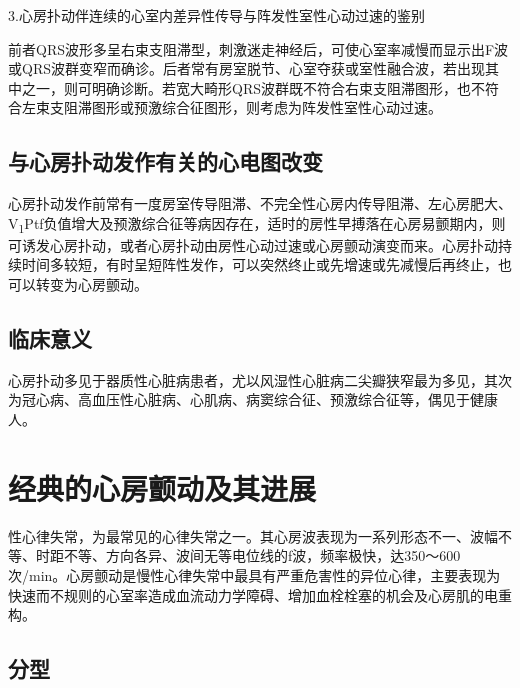 3.心房扑动伴连续的心室内差异性传导与阵发性室性心动过速的鉴别

前者QRS波形多呈右束支阻滞型，刺激迷走神经后，可使心室率减慢而显示出F波或QRS波群变窄而确诊。后者常有房室脱节、心室夺获或室性融合波，若出现其中之一，则可明确诊断。若宽大畸形QRS波群既不符合右束支阻滞图形，也不符合左束支阻滞图形或预激综合征图形，则考虑为阵发性室性心动过速。

\protect\hypertarget{text00020.htmlux5cux23subid198}{}{}

\subsection{与心房扑动发作有关的心电图改变}

心房扑动发作前常有一度房室传导阻滞、不完全性心房内传导阻滞、左心房肥大、V\textsubscript{1}Ptf负值增大及预激综合征等病因存在，适时的房性早搏落在心房易颤期内，则可诱发心房扑动，或者心房扑动由房性心动过速或心房颤动演变而来。心房扑动持续时间多较短，有时呈短阵性发作，可以突然终止或先增速或先减慢后再终止，也可以转变为心房颤动。

\protect\hypertarget{text00020.htmlux5cux23subid199}{}{}

\subsection{临床意义}

心房扑动多见于器质性心脏病患者，尤以风湿性心脏病二尖瓣狭窄最为多见，其次为冠心病、高血压性心脏病、心肌病、病窦综合征、预激综合征等，偶见于健康人。

\protect\hypertarget{text00020.htmlux5cux23subid200}{}{}

\section{经典的心房颤动及其进展}

  性心律失常，为最常见的心律失常之一。其心房波表现为一系列形态不一、波幅不等、时距不等、方向各异、波间无等电位线的f波，频率极快，达350～600次/min。心房颤动是慢性心律失常中最具有严重危害性的异位心律，主要表现为快速而不规则的心室率造成血流动力学障碍、增加血栓栓塞的机会及心房肌的电重构。

\protect\hypertarget{text00020.htmlux5cux23subid201}{}{}

\subsection{分型}


